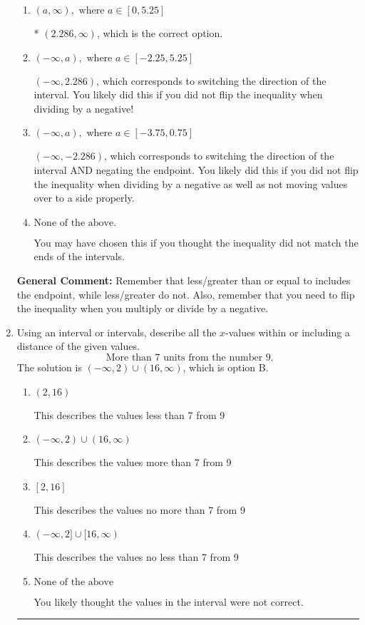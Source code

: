 \documentclass{extbook}[14pt]
\newcommand{\litem}[1]{\item #1

\rule{\textwidth}{0.4pt}}
\begin{document}
\begin{enumerate}
{\begin{enumerate}[label=\Alph*.]
 $(-2.286, \infty)$, which corresponds to negating the endpoint of the solution.
\item \( (a, \infty), \text{ where } a \in [0, 5.25] \)

* $(2.286, \infty)$, which is the correct option.
\item \( (-\infty, a), \text{ where } a \in [-2.25, 5.25] \)

 $(-\infty, 2.286)$, which corresponds to switching the direction of the interval. You likely did this if you did not flip the inequality when dividing by a negative!
\item \( (-\infty, a), \text{ where } a \in [-3.75, 0.75] \)

 $(-\infty, -2.286)$, which corresponds to switching the direction of the interval AND negating the endpoint. You likely did this if you did not flip the inequality when dividing by a negative as well as not moving values over to a side properly.
\item \( \text{None of the above}. \)

You may have chosen this if you thought the inequality did not match the ends of the intervals.
\end{enumerate}

\textbf{General Comment:} Remember that less/greater than or equal to includes the endpoint, while less/greater do not. Also, remember that you need to flip the inequality when you multiply or divide by a negative.
}
\litem{
Using an interval or intervals, describe all the $x$-values within or including a distance of the given values.
\[ \text{ More than } 7 \text{ units from the number } 9. \]The solution is \( (-\infty, 2) \cup (16, \infty) \), which is option B.\begin{enumerate}[label=\Alph*.]
\item \( (2, 16) \)

This describes the values less than 7 from 9
\item \( (-\infty, 2) \cup (16, \infty) \)

This describes the values more than 7 from 9
\item \( [2, 16] \)

This describes the values no more than 7 from 9
\item \( (-\infty, 2] \cup [16, \infty) \)

This describes the values no less than 7 from 9
\item \( \text{None of the above} \)

You likely thought the values in the interval were not correct.
\end{enumerate}

}
\end{enumerate}
\end{document}

